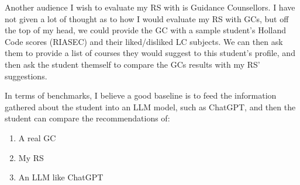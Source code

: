 \documentclass{article}  %
\begin{document}
    Another audience I wish to evaluate my RS with is Guidance Counsellors. 
    I have not given a lot of thought as to how I would evaluate my RS with GCs, but off the top of my head,
    we could provide the GC with a sample student's Holland Code scores (RIASEC) and their liked/disliked LC subjects. 
    We can then ask them to provide a list of courses they would suggest to this student's profile, and then ask the student themself
    to compare the GCs results with my RS' suggestions.

    In terms of benchmarks, I believe a good baseline is to feed the information gathered about the student into an LLM model, such as ChatGPT,
    and then the student can compare the recommendations of:

    \begin{enumerate}
        \item A real GC
        \item My RS
        \item An LLM like ChatGPT
    \end{enumerate}
	
\end{document}
